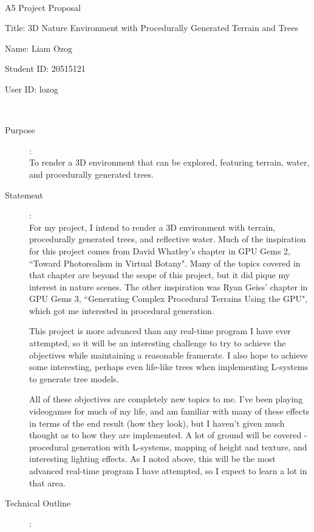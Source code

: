 \documentclass {article}
\begin{document}
~\vfill
\begin{center}
\Large

A5 Project Proposal

Title: 3D Nature Environment with Procedurally Generated Terrain and Trees

Name: Liam Ozog

Student ID: 20515121

User ID: lozog
\end{center}
\vfill ~\vfill~
\newpage
{}
\begin{description}
\item[Purpose]:\\
	To render a 3D environment that can be explored, featuring terrain, water, and procedurally generated trees.

\item[Statement]:\\

	For my project, I intend to render a 3D environment with terrain, procedurally generated trees, and reflective water. Much of the inspiration for this project comes from David Whatley's chapter in GPU Gems 2, ``Toward Photorealism in Virtual Botany". Many of the topics covered in that chapter are beyond the scope of this project, but it did pique my interest in nature scenes. The other inspiration was Ryan Geiss' chapter in GPU Gems 3, ``Generating Complex Procedural Terrains Using the GPU", which got me interested in procedural generation.

	This project is more advanced than any real-time program I have ever attempted, so it will be an interesting challenge to try to achieve the objectives while maintaining a reasonable framerate. I also hope to achieve some interesting, perhaps even life-like trees when implementing L-systems to generate tree models.

	All of these objectives are completely new topics to me. I've been playing videogames for much of my life, and am familiar with many of these effects in terms of the end result (how they look), but I haven't given much thought as to how they are implemented. A lot of ground will be covered - procedural generation with L-systems, mapping of height and texture, and interesting lighting effects. As I noted above, this will be the most advanced real-time program I have attempted, so I expect to learn a lot in that area.

\item[Technical Outline]:\\


\end{description}
\end{document}

